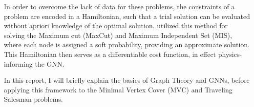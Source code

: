 In order to overcome the lack of data for these problems, the constraints of a problem are encoded in a Hamiltonian, such that a trial solution can be evaluated without apriori knowledge of the optimal solution.
\textcite{Schuetz_2022} utilized this method for solving the Maximum cut (MaxCut) and Maximum Independent Set (MIS), where each node is assigned a soft probability, providing an approximate solution.
This Hamiltonian then serves as a differentiable cost function, in effect physics-informing the GNN.

In this report, I will briefly explain the basics of Graph Theory and GNNs, before applying this framework to the Minimal Vertex Cover (MVC) and Traveling Salesman problems.

